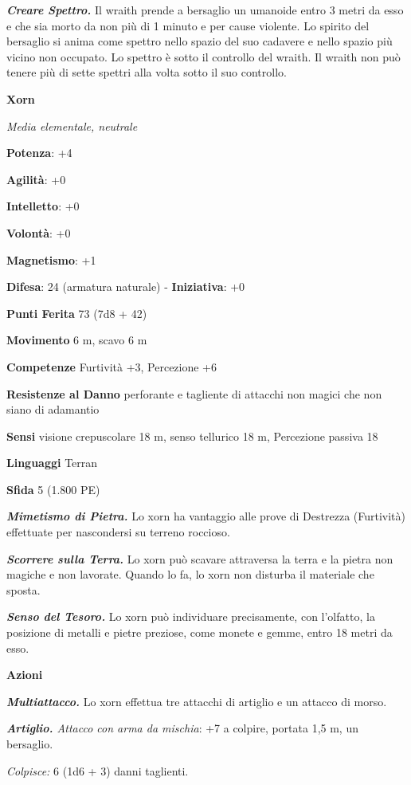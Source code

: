 \begin{multicols}{2}
\emph{\textbf{Creare Spettro.}} Il wraith prende a bersaglio un umanoide
entro 3 metri da esso e che sia morto da non più di 1 minuto e per cause
violente. Lo spirito del bersaglio si anima come spettro nello spazio
del suo cadavere e nello spazio più vicino non occupato. Lo spettro è
sotto il controllo del wraith. Il wraith non può tenere più di sette
spettri alla volta sotto il suo controllo.

\textbf{Xorn}

\emph{Media elementale, neutrale}

\textbf{Potenza}: +4

\textbf{Agilità}: +0

\textbf{Intelletto}: +0

\textbf{Volontà}: +0

\textbf{Magnetismo}: +1

\textbf{Difesa}: 24 (armatura naturale) - \textbf{Iniziativa}: +0

\textbf{Punti Ferita} 73 (7d8 + 42)

\textbf{Movimento} 6 m, scavo 6 m

\textbf{Competenze} Furtività +3, Percezione +6

\textbf{Resistenze al Danno} perforante e tagliente di attacchi non
magici che non siano di adamantio

\textbf{Sensi} visione crepuscolare 18 m, senso tellurico 18 m, Percezione
passiva 18

\textbf{Linguaggi} Terran

\textbf{Sfida} 5 (1.800 PE)

\emph{\textbf{Mimetismo di Pietra.}} Lo xorn ha vantaggio alle prove di
Destrezza (Furtività) effettuate per nascondersi su terreno roccioso.

\emph{\textbf{Scorrere sulla Terra.}} Lo xorn può scavare attraversa la
terra e la pietra non magiche e non lavorate. Quando lo fa, lo xorn non
disturba il materiale che sposta.

\emph{\textbf{Senso del Tesoro.}} Lo xorn può individuare precisamente,
con l'olfatto, la posizione di metalli e pietre preziose, come monete e
gemme, entro 18 metri da esso.

\textbf{Azioni}

\emph{\textbf{Multiattacco.}} Lo xorn effettua tre attacchi di artiglio
e un attacco di morso.

\emph{\textbf{Artiglio.} Attacco con arma da mischia}: +7 a colpire,
portata 1,5 m, un bersaglio.

\emph{Colpisce:} 6 (1d6 + 3) danni taglienti.


\end{multicols}
